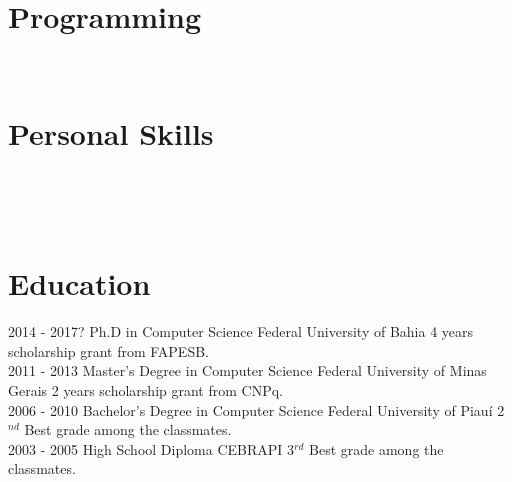 \documentclass[]{friggeri-cv}
\begin{document}
\begin{aside}
  \section{Programming}
    ~
  \section{Personal Skills}
    ~
\end{aside}
~
\section{Education}
\begin{entrylist}
     \entry
     {2014 - 2017?}
     {Ph.D in Computer Science}
     {Federal University of Bahia}
     {4 years scholarship grant from FAPESB.\\}
    \entry
    {2011 - 2013}
    {Master's Degree in Computer Science}
    {Federal University of Minas Gerais}
    {2 years scholarship grant from CNPq.\\}
    \entry
    {2006 - 2010}
    {Bachelor's Degree in Computer Science}
    {Federal University of Piauí}
    {2$^{nd}$ Best grade among the classmates.\\}
    \entry
    {2003 - 2005}
    {High School Diploma}
    {CEBRAPI}
    {3$^{rd}$ Best grade among the classmates.}
\end{entrylist}
\\
\end{document}
